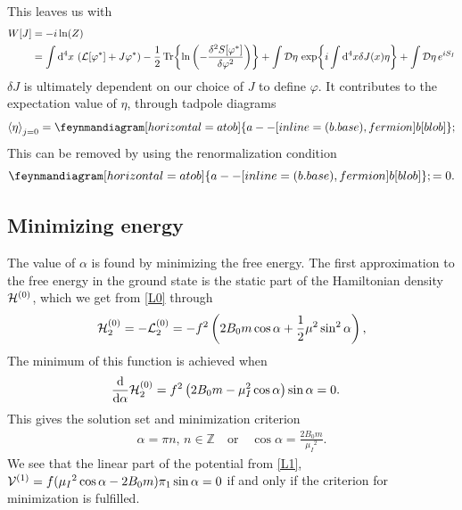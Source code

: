 This leaves us with 
\begin{align}
    \label{generating functional}
    W[J] 
    & = -i \ln(Z) \\
    & = 
    \int\dd^4 x \, \left(\mathcal{L}[\varphi^*] + J \varphi^*\right)
    - \frac{1}{2} \Tr{\ln\left( - \frac{\delta^2 S[\varphi^*]}{\delta \varphi^2} \right)}
    + \int \mathcal{D} \eta \, \exp{i \int \dd^4 x \delta J(x) \eta  }
    + \int \mathcal{D} \eta \, e^{iS_I}
\end{align}
$\delta J$ is ultimately dependent on our choice of $J$ to define $\varphi$.
It contributes to the expectation value of $\eta$, through tadpole diagrams
\begin{align}
    \ex{\eta}_{j=0} = 
    \feynmandiagram [horizontal=a to b]{
    a --[inline=(b.base), fermion] b[blob]
    }; 
\end{align}
This can be removed by using the renormalization condition
\begin{equation}
    \feynmandiagram [horizontal=a to b]{
    a --[inline=(b.base), fermion] b[blob]
    };
    = 0.
\end{equation}


\subsection{Minimizing energy}
The value of $\alpha$ is found by minimizing the free energy. 
The first approximation to the free energy in the ground state is the static part of the Hamiltonian density $\mathcal{H}^{(0)}$, which we get from \autoref{L0} through
\begin{equation}
    \mathcal{H}_2^{(0)} = - \mathcal{L}_2^{(0)} = 
    -f^2   
    \left(
        2B_0m \cos{\alpha}
        + \frac{1}{2} \mu^2 \sin^2{\alpha}
    \right),
\end{equation}
The minimum of this function is achieved when
\begin{align*}
    &\dv{\alpha} \mathcal{H}_2^{(0)} 
    = f^2\left(2B_0m - \mu_I^2\cos{\alpha}\right)\sin{\alpha}
    = 0.
\end{align*}
This gives the solution set and minimization criterion
\begin{align}
    \alpha = \pi n, \, n \in \mathbb{Z} \quad
    \mathrm{or} \quad
    \cos{\alpha} = \frac{2B_0m}{\mu_I{}^2}.
\end{align}
We see that the linear part of the potential from \autoref{L1}, $\mathcal{V}^{(1)} = f(\mu_I{}^2\cos{\alpha} - 2B_0m)\pi_1 \sin{\alpha}= 0$ if and only if the criterion for minimization is fulfilled.


